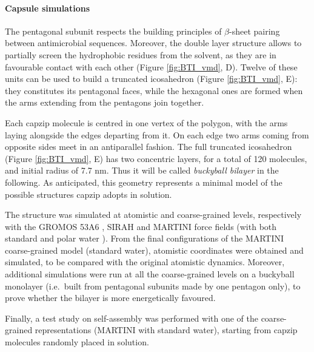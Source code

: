 \paragraph{Capsule simulations} The pentagonal subunit respects the building principles of $\beta$-sheet pairing between antimicrobial sequences. Moreover, the double layer structure allows to partially screen the hydrophobic residues from the solvent, as they are in favourable contact with each other (Figure \ref{fig:BTI_vmd}, D).
%
Twelve of these units can be used to build a truncated icosahedron (Figure \ref{fig:BTI_vmd}, E): they constitutes its pentagonal faces, while the hexagonal ones are formed when the arms extending from the pentagons join together.

Each capzip molecule is centred in one vertex of the polygon, with the arms laying alongside the edges departing from it. On each edge two arms coming from opposite sides meet in an antiparallel fashion.
%
The full truncated icosahedron (Figure \ref{fig:BTI_vmd}, E) has two concentric layers, for a total of 120 molecules, and initial radius of 7.7 nm. Thus it will be called \emph{buckyball bilayer} in the following.
%
As anticipated, this geometry represents a minimal model of the possible structures capzip adopts in solution.

The structure was simulated at atomistic and coarse-grained levels, respectively with the GROMOS 53A6 \citep{Oostenbrink2004}, SIRAH \citep{Machado2018} and MARTINI \citep{Marrink2007, Monticelli2008} force fields (with both standard and polar water \citep{Yesylevskyy2010}).
From the final configurations of the MARTINI coarse-grained model (standard water), atomistic coordinates were obtained and simulated, to be compared with the original atomistic dynamics.
%
Moreover, additional simulations were run at all the coarse-grained levels on a buckyball monolayer (i.e.\ built from pentagonal subunits made by one pentagon only), to prove whether the bilayer is more energetically favoured.

Finally, a test study on self-assembly was performed with one of the coarse-grained representations (MARTINI with standard water), starting from capzip molecules randomly placed in solution.

